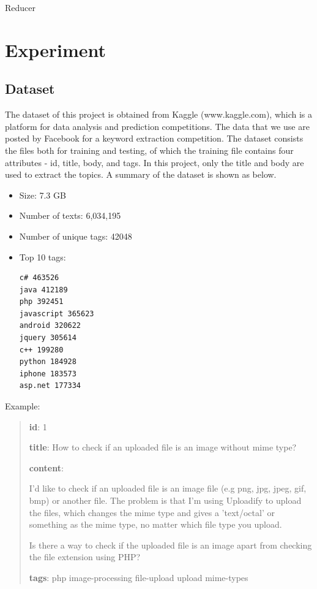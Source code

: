 \documentclass[conference]{IEEEtran}
\begin{document}
\begin{algorithm}
\caption{Reducer}
\label{alg:lda_reduce}
\begin{algorithmic}
\end{algorithmic}
\end{algorithm}

\section{Experiment}
\subsection{Dataset}
The dataset of this project is obtained from Kaggle (www.kaggle.com), which is a platform for data analysis and prediction competitions. The data that we use are posted by Facebook for a keyword extraction competition. The dataset consists the files both for training and testing, of which the training file contains four attributes - id, title, body, and tags. In this project, only the title and body are used to extract the topics. A summary of the dataset is shown as below.
\begin{itemize}
\item Size: 7.3 GB
\item Number of texts: 6,034,195
\item Number of unique tags: 42048
\item Top 10 tags:\\
\begin{verbatim}
c# 463526
java 412189
php 392451
javascript 365623
android 320622
jquery 305614
c++ 199280
python 184928
iphone 183573
asp.net 177334
\end{verbatim}
\end{itemize}
Example:
\begin{quote}

\textbf{id}: 1

\textbf{title}: How to check if an uploaded file is an image without mime type?

\textbf{content}:

I'd like to check if an uploaded file is an image file (e.g png, jpg,  jpeg, gif, bmp) or another file. The problem is that I'm using Uploadify  to upload the files, which changes the mime type and gives a 'text/octal'  or something as the mime type, no matter which file type you upload.


Is there a way to check if the uploaded file is an image apart from checking the file extension using PHP?

\textbf{tags}: php image-processing file-upload upload mime-types
\end{quote}
\end{document}
